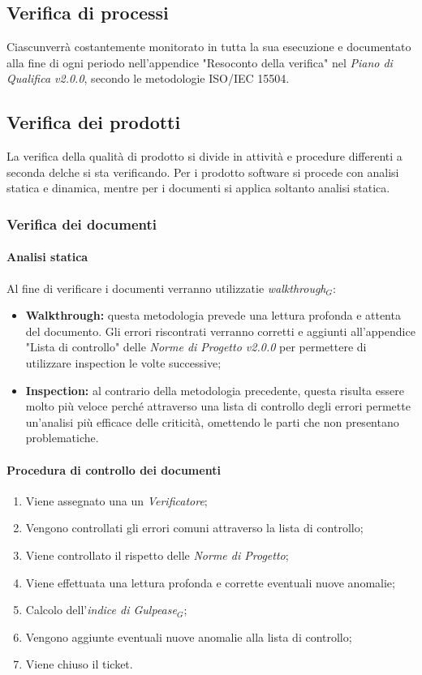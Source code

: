\subsection{Verifica di processi}
Ciascunverrà costantemente monitorato in tutta la sua esecuzione e documentato alla fine di ogni periodo nell'appendice "Resoconto della verifica" nel \textit{Piano di Qualifica v2.0.0}, secondo le metodologie ISO/IEC 15504.

\subsection{Verifica dei prodotti}
La verifica della qualità di prodotto si divide in attività e procedure differenti a seconda delche si sta verificando. Per i prodotto software si procede con analisi statica e dinamica, mentre per i documenti si applica soltanto analisi statica.
\subsubsection{Verifica dei documenti}
\paragraph{Analisi statica}
Al fine di verificare i documenti verranno utilizzatie \textit{walkthrough$_{G}$}:
\begin{itemize}
	\item \textbf{Walkthrough:} questa metodologia prevede una lettura profonda e attenta del documento. Gli errori riscontrati verranno corretti e aggiunti all'appendice "Lista di controllo" delle \textit{Norme di Progetto v2.0.0} per permettere di utilizzare inspection le volte successive;
	\item \textbf{Inspection:} al contrario della metodologia precedente, questa risulta essere molto più veloce perché attraverso una lista di controllo degli errori permette un'analisi più efficace delle criticità, omettendo le parti che non presentano problematiche. 
\end{itemize}
\paragraph{Procedura di controllo dei documenti}
\begin{enumerate}
	\item Viene assegnato una un \textit{Verificatore};
	\item Vengono controllati gli errori comuni attraverso la lista di controllo;
	\item Viene controllato il rispetto delle \textit{Norme di Progetto};
	\item Viene effettuata una lettura profonda e corrette eventuali nuove anomalie;
	\item Calcolo dell'\textit{indice di Gulpease$_{G}$};
	\item Vengono aggiunte eventuali nuove anomalie alla lista di controllo;
	\item Viene chiuso il ticket.
\end{enumerate}
